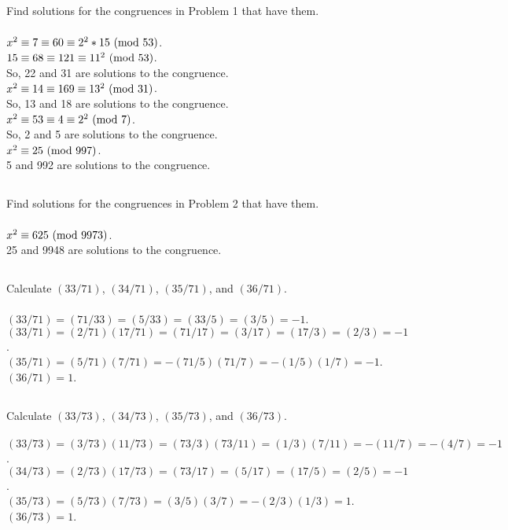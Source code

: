 \documentclass{article} \usepackage{amsmath}
\begin{document}
\subsection{}
Find solutions for the congruences in Problem 1 that have them.\\~\\
$x^2 \equiv 7 \equiv 60 \equiv 2^2*15 \ (\mathrm{mod}\ 53)$.\\
$15 \equiv 68 \equiv 121 \equiv 11^2 \ (\mathrm{mod}\ 53)$.\\
So, 22 and 31 are solutions to the congruence.\\
$x^2 \equiv 14 \equiv 169 \equiv 13^2 \ (\mathrm{mod}\ 31)$.\\
So, 13 and 18 are solutions to the congruence.\\
$x^2 \equiv 53 \equiv 4 \equiv 2^2 \ (\mathrm{mod}\ 7)$.\\
So, 2 and 5 are solutions to the congruence.\\
$x^2 \equiv 25 \ (\mathrm{mod}\ 997)$.\\
5 and 992 are solutions to the congruence.

\subsection{}
Find solutions for the congruences in Problem 2 that have them.\\~\\
$x^2 \equiv 625 \ (\mathrm{mod}\ 9973)$.\\
25 and 9948 are solutions to the congruence.

\subsection{}
Calculate $(33/71)$, $(34/71)$, $(35/71)$, and $(36/71)$.\\~\\
$(33/71) = (71/33) = (5/33) = (33/5) = (3/5) = -1$.\\
$(33/71) = (2/71)(17/71) = (71/17) = (3/17) = (17/3) = (2/3) = -1$.\\
$(35/71) = (5/71)(7/71) = -(71/5)(71/7) = -(1/5)(1/7) = -1$.\\
$(36/71) = 1$.\\

\subsection{}
Calculate $(33/73)$, $(34/73)$, $(35/73)$, and $(36/73)$.\\~\\
$(33/73) = (3/73)(11/73) = (73/3)(73/11) = (1/3)(7/11) = -(11/7) = -(4/7) = -1$.\\
$(34/73) = (2/73)(17/73) = (73/17) = (5/17) = (17/5) = (2/5) = -1$.\\
$(35/73) = (5/73)(7/73) = (3/5)(3/7) = -(2/3)(1/3) = 1$.\\
$(36/73) = 1$.\\
\end{document}
